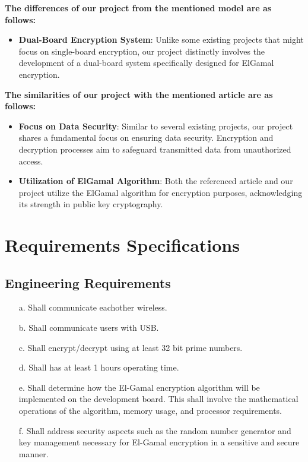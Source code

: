\documentclass[12pt]{article}
\begin{document}
	 \textbf{The differences of our project from the mentioned model are as follows:}
	 \begin{itemize}
	 	\item \textbf{Dual-Board Encryption System}: Unlike some existing projects that might focus on single-board encryption, our project distinctly involves the development of a dual-board system specifically designed for ElGamal encryption.
	 \end{itemize}
	 
	 \textbf{The similarities of our project with the mentioned article are as follows:}
	 \begin{itemize}
	 	\item \textbf{Focus on Data Security}: Similar to several existing projects, our project shares a fundamental focus on ensuring data security. Encryption and decryption processes aim to safeguard transmitted data from unauthorized access.
	 	
	 	\item \textbf{Utilization of ElGamal Algorithm}: Both the referenced article and our project utilize the ElGamal algorithm for encryption purposes, acknowledging its strength in public key cryptography\cite{9166586}.
	 \end{itemize}
		

		
	
	
	\section{Requirements Specifications}
		
	\subsection{Engineering Requirements}
	\begin{enumerate}
		\item[a.] Shall communicate eachother wireless.
		\item[b.] Shall communicate users with USB.
		\item[c.] Shall encrypt/decrypt using at least 32 bit prime numbers.
		\item[d.] Shall has at least 1 hours operating time.
		\item[e.] Shall determine how the El-Gamal encryption algorithm will be implemented on the development board. This shall involve the mathematical operations of the algorithm, memory usage, and processor requirements. 
		\item[f.] Shall address security aspects such as the random number generator and key management necessary for El-Gamal encryption in a sensitive and secure manner.
		
	
				
	\end{enumerate}
\end{document}
